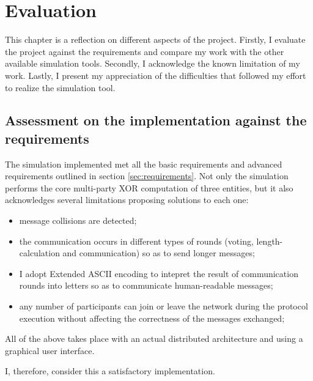 \chapter{Evaluation}

This chapter is a reflection on different aspects of the project. Firstly, I evaluate the project against the requirements and compare my work with the other available simulation tools. Secondly, I acknowledge the known limitation of my work. Lastly, I present my appreciation of the difficulties that followed my effort to realize the simulation tool.

\section{Assessment on the implementation against the requirements}
The simulation implemented met all the basic requirements and advanced requirements outlined in section \ref{sec:requirements}. Not only the simulation performs the core multi-party XOR computation of three entities, but it also acknowledges several limitations proposing solutions to each one:
\begin{itemize}
    \item message collisions are detected;
    \item the communication occurs in different types of rounds (voting, length-calculation and communication) so as to send longer messages;
    \item I adopt Extended ASCII encoding to intepret the result of communication rounds into letters so as to communicate human-readable messages;
    \item any number of participants can join or leave the network during the protocol execution without affecting the correctness of the messages exchanged;
\end{itemize}
All of the above takes place with an actual distributed architecture and using a graphical user interface.

I, therefore, consider this a satisfactory implementation.


